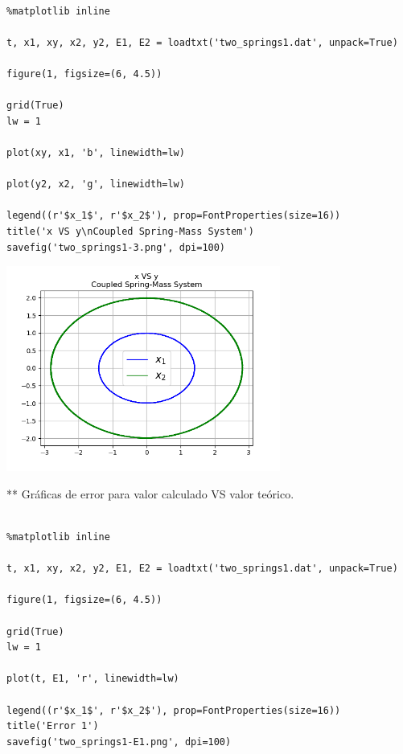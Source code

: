 \documentclass{article} %
\begin{document}
\begin{verbatim} 

%matplotlib inline

t, x1, xy, x2, y2, E1, E2 = loadtxt('two_springs1.dat', unpack=True)

figure(1, figsize=(6, 4.5))

grid(True)
lw = 1

plot(xy, x1, 'b', linewidth=lw)

plot(y2, x2, 'g', linewidth=lw)

legend((r'$x_1$', r'$x_2$'), prop=FontProperties(size=16))
title('x VS y\nCoupled Spring-Mass System')
savefig('two_springs1-3.png', dpi=100)

\end{verbatim}



\begin{center}
 	\includegraphics[width=9cm]{two_springs1-3.png}
 \end{center}



** Gráficas de error para valor calculado VS valor teórico.


\begin{verbatim} 

%matplotlib inline

t, x1, xy, x2, y2, E1, E2 = loadtxt('two_springs1.dat', unpack=True)

figure(1, figsize=(6, 4.5))

grid(True)
lw = 1

plot(t, E1, 'r', linewidth=lw)

legend((r'$x_1$', r'$x_2$'), prop=FontProperties(size=16))
title('Error 1')
savefig('two_springs1-E1.png', dpi=100)

\end{verbatim}
\end{document}
